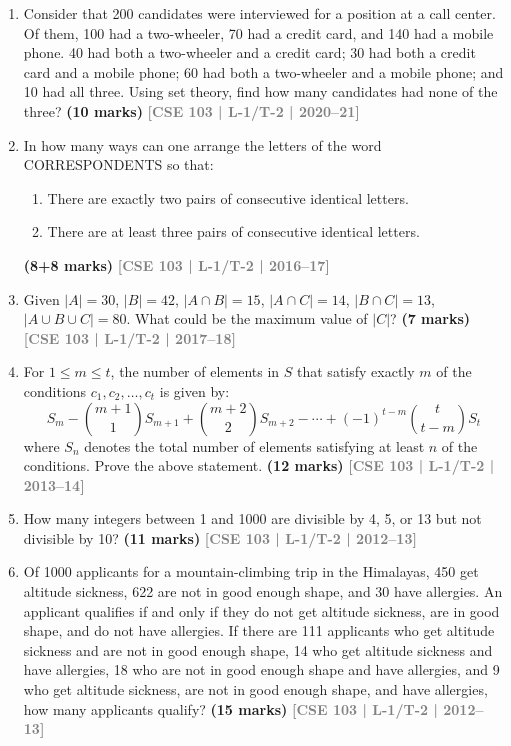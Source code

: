 \documentclass[12pt,a3paper]{article}
\newcommand{\yr}[1]{\hfill\textcolor{gray}{\small\textbf{[#1]}}}
\newcommand{\mk}[1]{\textcolor{orange!70!black}{\small\textbf{(#1 marks)}}}
\begin{document}
\begin{enumerate}

\item Consider that 200 candidates were interviewed for a position at a call center. Of them, 100 had a two-wheeler, 70 had a credit card, and 140 had a mobile phone. 40 had both a two-wheeler and a credit card; 30 had both a credit card and a mobile phone; 60 had both a two-wheeler and a mobile phone; and 10 had all three. Using set theory, find how many candidates had none of the three?
\mk{10} \yr{CSE 103 | L-1/T-2 | 2020--21}

\item In how many ways can one arrange the letters of the word CORRESPONDENTS so that:
\begin{enumerate}
  \item There are exactly two pairs of consecutive identical letters.
  \item There are at least three pairs of consecutive identical letters.
\end{enumerate}
\mk{8+8} \yr{CSE 103 | L-1/T-2 | 2016--17}

\item Given $|A| = 30$, $|B| = 42$, $|A \cap B| = 15$, $|A \cap C| = 14$, $|B \cap C| = 13$, $|A \cup B \cup C| = 80$. What could be the maximum value of $|C|$?
\mk{7} \yr{CSE 103 | L-1/T-2 | 2017--18}   

\item For $1 \leq m \leq t$, the number of elements in $S$ that satisfy exactly $m$ of the conditions $c_1, c_2, \ldots, c_t$ is given by:
\[
  S_m - \binom{m+1}{1}S_{m+1} + \binom{m+2}{2}S_{m+2} - \cdots + (-1)^{t-m}\binom{t}{t-m}S_t
\]
where $S_n$ denotes the total number of elements satisfying at least $n$ of the conditions. Prove the above statement.
\mk{12} \yr{CSE 103 | L-1/T-2 | 2013--14}

\item How many integers between 1 and 1000 are divisible by 4, 5, or 13 but not divisible by 10?
\mk{11} \yr{CSE 103 | L-1/T-2 | 2012--13}

\item Of 1000 applicants for a mountain-climbing trip in the Himalayas, 450 get altitude sickness, 622 are not in good enough shape, and 30 have allergies. An applicant qualifies if and only if they do not get altitude sickness, are in good shape, and do not have allergies. If there are 111 applicants who get altitude sickness and are not in good enough shape, 14 who get altitude sickness and have allergies, 18 who are not in good enough shape and have allergies, and 9 who get altitude sickness, are not in good enough shape, and have allergies, how many applicants qualify?
\mk{15} \yr{CSE 103 | L-1/T-2 | 2012--13}


\end{enumerate}
\end{document}
